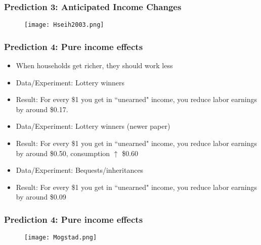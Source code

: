 \documentclass{beamer}
\begin{document}
\begin{frame}
\frametitle{Prediction 3: Anticipated Income Changes}
\begin{figure}
\centering
\bigskip
\texttt{[image: Hseih2003.png]}
\end{figure}
\end{frame}




\begin{frame}
\frametitle{Prediction 4: Pure income effects}
\begin{itemize}
\item When households get richer, they should work less  
\bigskip
\item Data/Experiment:  Lottery winners
\bigskip
\item Result:  For every \$1 you get in ``unearned" income, you reduce labor earnings by around \$0.17.
\bigskip
\item Data/Experiment:  Lottery winners (newer paper)
\bigskip
\item Result:  For every \$1 you get in ``unearned" income, you reduce labor earnings by around \$0.50, consumption $\uparrow$ \$0.60
\bigskip
\item Data/Experiment:  Bequests/inheritances
\bigskip
\item Result:  For every \$1 you get in ``unearned" income, you reduce labor earnings by around \$0.09
\end{itemize}
\end{frame}

\begin{frame}
\frametitle{Prediction 4: Pure income effects}
\begin{figure}
\centering
\texttt{[image: Mogstad.png]}
\end{figure}
\end{frame}
\end{document}
